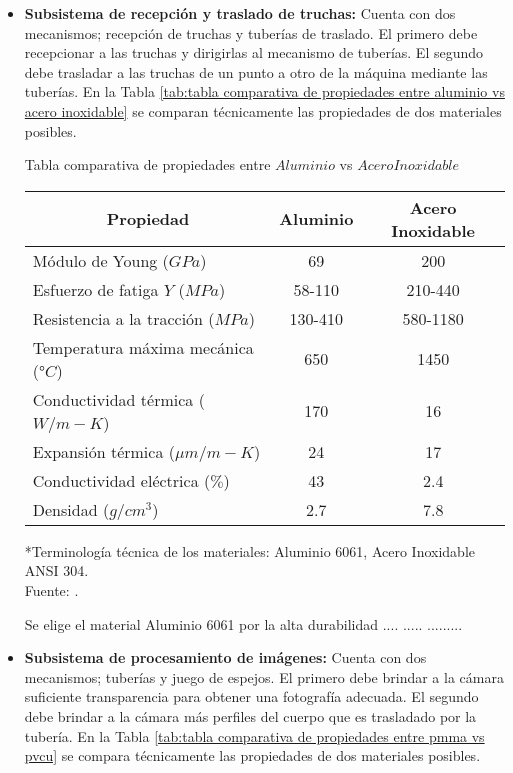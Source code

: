 \begin{itemize}
	\item \textbf{Subsistema de recepción y traslado de truchas:} Cuenta con dos mecanismos; recepción de truchas y tuberías de traslado. El primero debe recepcionar a las truchas y dirigirlas al mecanismo de tuberías. El segundo debe trasladar a las truchas de un punto a otro de la máquina mediante las tuberías. En la Tabla \ref{tab:tabla comparativa de propiedades entre aluminio vs acero inoxidable} se comparan técnicamente las propiedades de dos materiales posibles.
	
	\begin{mytable}[H]
		\centering
		\caption{Tabla comparativa de propiedades entre $Aluminio$ vs $Acero Inoxidable$}
		\label{tab:tabla comparativa de propiedades entre aluminio vs acero inoxidable}
		\begin{tabular}{|l|c|c|}
			\hline
			\multicolumn{1}{|c|}{\textbf{Propiedad}} & \textbf{Aluminio} & \textbf{Acero Inoxidable} \\ \hline
			Módulo de Young ($GPa$) & 69 & 200 \\ \hline
			Esfuerzo de fatiga $Y$ ($MPa$) & 58-110 & 210-440 \\ \hline
			Resistencia a la tracción ($MPa$) & 130-410 & 580-1180 \\ \hline
			Temperatura máxima mecánica ($°C$) & 650 & 1450 \\ \hline
			Conductividad térmica ($W/m-K$) & 170 & 16 \\ \hline
			Expansión térmica (${\mu}m/m-K$) & 24 & 17 \\ \hline
			Conductividad eléctrica ($\%$) & 43 & 2.4 \\ \hline
			Densidad ($g/cm^3$) & 2.7 & 7.8 \\ \hline
		\end{tabular}
		\begin{flushleft}
			*Terminología técnica de los materiales: Aluminio 6061, Acero Inoxidable ANSI 304.\\		
			Fuente: \cite{MakeItFrom2020}.
		\end{flushleft}
	\end{mytable}

	Se elige el material Aluminio 6061 por la alta durabilidad .... ..... .........
	
	\item \textbf{Subsistema de procesamiento de imágenes:} Cuenta con dos mecanismos; tuberías y juego de espejos. El primero debe brindar a la cámara suficiente transparencia para obtener una fotografía adecuada. El segundo debe brindar a la cámara más perfiles del cuerpo que es trasladado por la tubería. En la Tabla \ref{tab:tabla comparativa de propiedades entre pmma vs pvcu} se compara técnicamente las propiedades de dos materiales posibles.
	

\end{itemize}
